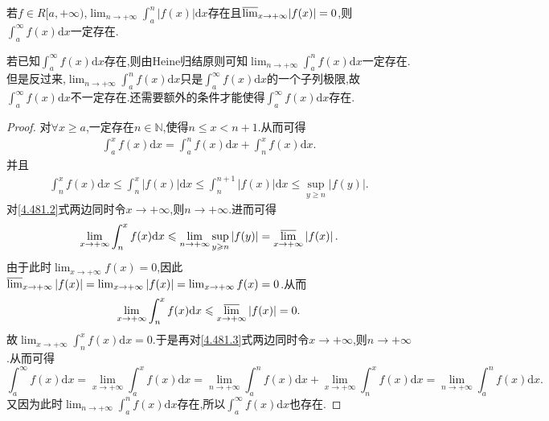 \documentclass[../../main.tex]{subfiles}%
\begin{document}
\begin{proposition}\label{proposition:反常积分与其子列极限存在命题}
若\(f\in R[a, +\infty)\),\(\lim_{n\rightarrow +\infty}\int_a^n|f(x)|\mathrm{d}x\)存在且\({\varlimsup_{x\rightarrow +\infty}}|f(x)| = 0\),则\(\int_a^{\infty}f(x)\mathrm{d}x\)一定存在.
\end{proposition}
\begin{note}
若已知$\int_a^{\infty}f(x)\mathrm{d}x$存在,则由Heine归结原则可知\(\lim_{n\rightarrow +\infty}\int_a^n f(x)\mathrm{d}x\)一定存在.但是反过来,\(\lim_{n\rightarrow +\infty}\int_a^n f(x)\mathrm{d}x\)只是$\int_a^{\infty}f(x)\mathrm{d}x$的一个子列极限,故$\int_a^{\infty}f(x)\mathrm{d}x$不一定存在.还需要额外的条件才能使得$\int_a^{\infty}f(x)\mathrm{d}x$存在.
\end{note}
\begin{proof}

对\(\forall x\geqslant a\),一定存在\(n\in\mathbb{N}\),使得\(n\leqslant x < n + 1\).从而可得
\begin{align}\label{4.481.3}
\int_a^x f(x)\mathrm{d}x=\int_a^n f(x)\mathrm{d}x+\int_n^x f(x)\mathrm{d}x. 
\end{align}
并且
\begin{align}\label{4.481.2}
\int_n^x f(x)\mathrm{d}x\leqslant\int_n^x\left|f(x)\right|\mathrm{d}x\leqslant\int_n^{n + 1}\left|f(x)\right|\mathrm{d}x\leqslant\sup_{y\geqslant n}\left|f(y)\right|.
\end{align}
对\eqref{4.481.2}式两边同时令\(x\rightarrow +\infty\),则\(n\rightarrow +\infty\).进而可得
\[
\lim_{x\rightarrow +\infty}\int_n^x f(x)\mathrm{d}x\leqslant\lim_{n\rightarrow +\infty}\sup_{y\geqslant n}\left|f(y)\right|={\varlimsup_{x\rightarrow +\infty}}\left|f(x)\right|.
\]
由于此时\(\lim_{x\rightarrow +\infty}f(x)=0\),因此\({\varlimsup_{x\rightarrow +\infty}}\left|f(x)\right|=\lim_{x\rightarrow +\infty}\left|f(x)\right|=\lim_{x\rightarrow +\infty}f(x)=0\).从而
\[
\lim_{x\rightarrow +\infty}\int_n^x f(x)\mathrm{d}x\leqslant{\varlimsup_{x\rightarrow +\infty}}\left|f(x)\right|=0.
\]
故\(\lim_{x\rightarrow +\infty}\int_n^x f(x)\mathrm{d}x = 0\).于是再对\eqref{4.481.3}式两边同时令\(x\rightarrow +\infty\),则\(n\rightarrow +\infty\).从而可得
\[
\int_a^{\infty}f(x)\mathrm{d}x=\lim_{x\rightarrow +\infty}\int_a^x f(x)\mathrm{d}x=\lim_{n\rightarrow +\infty}\int_a^n f(x)\mathrm{d}x+\lim_{x\rightarrow +\infty}\int_n^x f(x)\mathrm{d}x=\lim_{n\rightarrow +\infty}\int_a^n f(x)\mathrm{d}x.
\]
又因为此时\(\lim_{n\rightarrow +\infty}\int_a^n f(x)\mathrm{d}x\)存在,所以\(\int_a^{\infty}f(x)\mathrm{d}x\)也存在.

\end{proof}
\end{document}
